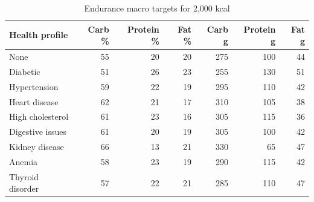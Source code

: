 \begin{table}[H]
\centering
\caption{Endurance macro targets for 2,000 kcal}
\begin{tabular}{lrrrrrr}
\toprule
Health profile & Carb \% & Protein \% & Fat \% & Carb g & Protein g & Fat g\\
\midrule
None & 55 & 20 & 20 & 275 & 100 & 44\\
Diabetic & 51 & 26 & 23 & 255 & 130 & 51\\
Hypertension & 59 & 22 & 19 & 295 & 110 & 42\\
Heart disease & 62 & 21 & 17 & 310 & 105 & 38\\
High cholesterol & 61 & 23 & 16 & 305 & 115 & 36\\
Digestive issues & 61 & 20 & 19 & 305 & 100 & 42\\
Kidney disease & 66 & 13 & 21 & 330 & 65 & 47\\
Anemia & 58 & 23 & 19 & 290 & 115 & 42\\
Thyroid disorder & 57 & 22 & 21 & 285 & 110 & 47\\
\bottomrule
\end{tabular}
\end{table}
